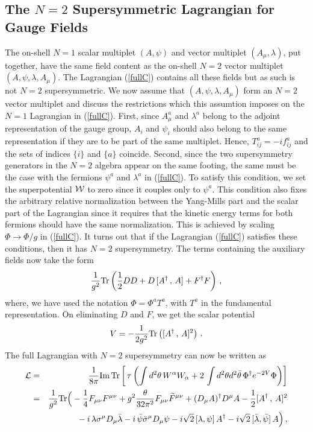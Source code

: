 \subsection{The $N=2$ Supersymmetric Lagrangian for Gauge Fields}

The on-shell $N=1$ scalar multiplet $(A, \psi)$ and vector multiplet
$(A_\mu,\lambda)$, put together, have the same field content as the
on-shell $N=2$ vector multiplet $(A,\psi,\lambda, A_\mu)$. The
Lagrangian (\ref{fullC}) contains all these fields but as such is not
$N=2$ supersymmetric. We now assume that $(A,\psi,\lambda, A_\mu)$
form an $N=2$ vector multiplet and discuss the restrictions which this
assumtion imposes on the $N=1$ Lagrangian in (\ref{fullC}). First,
since $A^a_\mu$ and $\lambda^a$ belong to the adjoint representation
of the gauge group, $A_i$ and $\psi_i$ should also belong to the same
representation if they are to be part of the same multiplet. Hence,
$T^a_{ij}=-if^a_{ij}$ and the sets of indices $\{ i \}$ and $\{ a \}$
coincide. Second, since the two supersymmetry generators in the $N=2$
algebra appear on the same footing, the same must be the case with the
fermions $\psi^a$ and $\lambda^a$ in (\ref{fullC}). To satisfy this
condition, we set the superpotential ${\cal W}$ to zero since it
couples only to $\psi^a$. This condition also fixes the arbitrary
relative normalization between the Yang-Mills part and the scalar part
of the Lagrangian since it requires that the kinetic energy terms for
both fermions should have the same normalization.  This is achieved by
scaling $\Phi\rightarrow\Phi/g$ in (\ref{fullC}).  It turns out that
if the Lagrangian (\ref{fullC}) satisfies these conditions, then it
has $N=2$ supersymmetry. The terms containing the auxiliary fields now
take the form
$$
\frac{1}{g^2}{\rm Tr}\left(\frac{1}{2}DD +D\,[A^\dagger\,,\,A] + 
F^\dagger F \right)\,, 
$$
where, we have used the notation $\Phi=\Phi^a T^a$, with $T^a$ in the
fundamental representation. On eliminating $D$ and $F$, we get the
scalar potential    
\begin{equation}
V=- \frac{1}{2g^2} {\rm Tr}\left([A^\dagger\,,\,A]^2 \right)\,.
\label{scalarV}
\end{equation}
The full Lagrangian with $N=2$ supersymmetry can now be written as  
\begin{eqnarray}
{\cal L}&=&\frac{1}{8\pi}{\rm Im\, Tr}\left[\,\tau\left(\int d^2\theta\,
W^\alpha W_\alpha +2\,\int d^2\theta d^2\bar\theta\, \Phi^\dagger 
e^{-2V}\Phi \right)\right] 
\nonumber \\ 
&=&\frac{1}{g^2}{\rm Tr}\Big(-\frac{1}{4}F_{\mu\nu}F^{\mu\nu}+ 
g^2\frac{\theta}{32\pi^2}F_{\mu\nu}\widetilde F^{\mu\nu}+
(D_\mu A)^\dagger D^\mu A -\frac{1}{2} [A^\dagger\,,\,A]^2
\nonumber\\
&&{\hphantom {\frac{1}{g^2}{\rm Tr}(\,} }
-i\,\lambda\sigma^\mu D_\mu\bar\lambda -i\,\bar{\psi} 
\bar{\sigma}^\mu D_\mu\psi-i\sqrt{2}\,[\lambda,\psi]\,A^\dagger
-i\sqrt{2}\,[\bar\lambda,\bar\psi]\,A \Big)\,,
\label{N=2}
\end{eqnarray}
